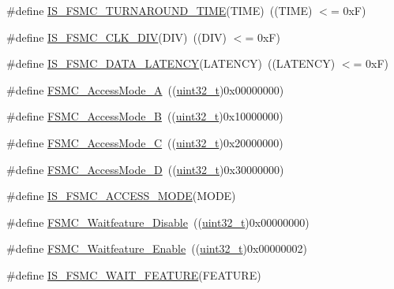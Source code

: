 \begin{DoxyCompactItemize}
\item 
\#define \hyperlink{group___f_s_m_c___bus___turn__around___duration_ga9ec626f30679a18af91bf48c52d9260d}{I\+S\+\_\+\+F\+S\+M\+C\+\_\+\+T\+U\+R\+N\+A\+R\+O\+U\+N\+D\+\_\+\+T\+I\+ME}(T\+I\+ME)~((T\+I\+ME) $<$= 0x\+F)
\item 
\#define \hyperlink{group___f_s_m_c___c_l_k___division_ga9e5321b02ea049fd076ba705acd06b5f}{I\+S\+\_\+\+F\+S\+M\+C\+\_\+\+C\+L\+K\+\_\+\+D\+IV}(D\+IV)~((D\+IV) $<$= 0x\+F)
\item 
\#define \hyperlink{group___f_s_m_c___data___latency_ga1ab8659a9631d8bb4f57d8be8580155c}{I\+S\+\_\+\+F\+S\+M\+C\+\_\+\+D\+A\+T\+A\+\_\+\+L\+A\+T\+E\+N\+CY}(L\+A\+T\+E\+N\+CY)~((L\+A\+T\+E\+N\+CY) $<$= 0x\+F)
\item 
\#define \hyperlink{group___f_s_m_c___access___mode_gae0f299b51c12257311694c4a8f5c00c3}{F\+S\+M\+C\+\_\+\+Access\+Mode\+\_\+A}~((\hyperlink{_p_e___types_8h_a33594304e786b158f3fb30289278f5af}{uint32\+\_\+t})0x00000000)
\item 
\#define \hyperlink{group___f_s_m_c___access___mode_ga2d6ce7481eb5e0e86fda727c646e4109}{F\+S\+M\+C\+\_\+\+Access\+Mode\+\_\+B}~((\hyperlink{_p_e___types_8h_a33594304e786b158f3fb30289278f5af}{uint32\+\_\+t})0x10000000)
\item 
\#define \hyperlink{group___f_s_m_c___access___mode_ga83ffa035cf2e95c957b67a2e8b879e86}{F\+S\+M\+C\+\_\+\+Access\+Mode\+\_\+C}~((\hyperlink{_p_e___types_8h_a33594304e786b158f3fb30289278f5af}{uint32\+\_\+t})0x20000000)
\item 
\#define \hyperlink{group___f_s_m_c___access___mode_ga7c632e7ebeb0c0ab4919bb60b8714c7b}{F\+S\+M\+C\+\_\+\+Access\+Mode\+\_\+D}~((\hyperlink{_p_e___types_8h_a33594304e786b158f3fb30289278f5af}{uint32\+\_\+t})0x30000000)
\item 
\#define \hyperlink{group___f_s_m_c___access___mode_ga1844335f297ea30e9d7fae09ce562092}{I\+S\+\_\+\+F\+S\+M\+C\+\_\+\+A\+C\+C\+E\+S\+S\+\_\+\+M\+O\+DE}(M\+O\+DE)
\item 
\#define \hyperlink{group___f_s_m_c___wait__feature_ga8a31f05576e66546fbbcdb06ff67da7d}{F\+S\+M\+C\+\_\+\+Waitfeature\+\_\+\+Disable}~((\hyperlink{_p_e___types_8h_a33594304e786b158f3fb30289278f5af}{uint32\+\_\+t})0x00000000)
\item 
\#define \hyperlink{group___f_s_m_c___wait__feature_ga3113366130dfbf6d116f1afb94af1726}{F\+S\+M\+C\+\_\+\+Waitfeature\+\_\+\+Enable}~((\hyperlink{_p_e___types_8h_a33594304e786b158f3fb30289278f5af}{uint32\+\_\+t})0x00000002)
\item 
\#define \hyperlink{group___f_s_m_c___wait__feature_ga07c2585b517df2c7afbe3ba16c22f236}{I\+S\+\_\+\+F\+S\+M\+C\+\_\+\+W\+A\+I\+T\+\_\+\+F\+E\+A\+T\+U\+RE}(F\+E\+A\+T\+U\+RE)

\end{DoxyCompactItemize}
